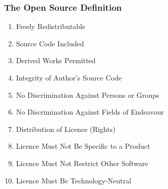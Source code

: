 \begin{frame}
  \frametitle{The Open Source Definition \footnotemark[6]}

  \begin{multicols}{2}
    \begin{enumerate}
      \small
      \item Freely Redistributable
      \item Source Code Included
      \item Derived Works Permitted
      \item Integrity of Author’s Source Code
      \item  No Discrimination Against Persons or Groups
      \item No Discrimination Against Fields of Endeavour
      \item Distribution of Licence (Rights)
      \item Licence Must Not Be Specific to a Product
      \item Licence Must Not Restrict Other Software
      \item Licence Must Be Technology-Neutral
    \end{enumerate}
  \end{multicols}
\end{frame}